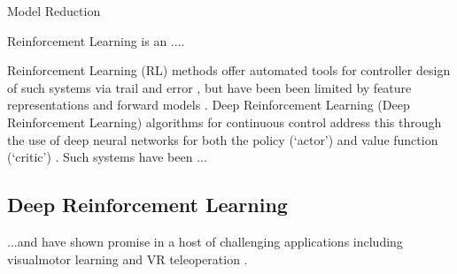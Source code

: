 \documentclass[letterpaper, 10 pt, conference]{ieeeconf}
\begin{document}



{Model Reduction}






Reinforcement Learning is an ....  

Reinforcement Learning (RL) methods offer automated tools for controller design of such systems via trail and error \cite{sutton1998reinforcement}, but have been been limited by feature representations and forward models \cite{duan2016benchmarking}.
Deep Reinforcement Learning (Deep Reinforcement Learning) algorithms for continuous control address this through the use of deep neural networks for both the policy (`actor') and value function (`critic') \cite{DDPG, SAC}.
Such systems have been  ...

\subsection{Deep Reinforcement Learning}

...and have shown promise in a host of challenging applications including visualmotor learning \cite{finn2016deep} and VR teleoperation \cite{zhang2018deep}. 





\end{document}
